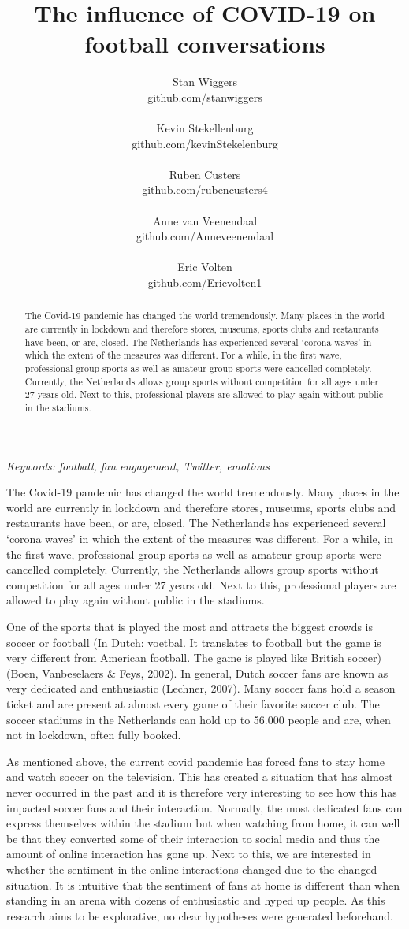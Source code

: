 \documentclass[12pt]{article}
\date{}
\title{The influence of COVID-19 on football conversations}
\author{Stan Wiggers \\ github.com/stanwiggers
\\ \\ Kevin Stekellenburg \\ github.com/kevinStekelenburg
\\ \\ Ruben Custers \\ github.com/rubencusters4
\\ \\ Anne van Veenendaal \\ github.com/Anneveenendaal
\\ \\ Eric Volten \\ github.com/Ericvolten1}
\providecommand{\keywords}[1]
{
   \small	
  \textit{\hspace{-1em} Keywords: } #1
}
\begin{document}
\maketitle
\thispagestyle{fancy}
\begin{abstract}
  \noindent  The Covid-19 pandemic has changed the world tremendously. Many places in the world are currently in lockdown and therefore stores, museums, sports clubs and restaurants have been, or are, closed. The Netherlands has experienced several ‘corona waves’ in which the extent of the measures was different. For a while, in the first wave, professional group sports as well as amateur group sports were cancelled completely. Currently, the Netherlands allows group sports without competition for all ages under 27 years old. Next to this, professional players are allowed to play again without public in the stadiums. 
\end{abstract}

\keywords{\textit{football, fan engagement, Twitter, emotions} \vspace{8ex}}

\noindent The Covid-19 pandemic has changed the world tremendously. Many places in the world are currently in lockdown and therefore stores, museums, sports clubs and restaurants have been, or are, closed. The Netherlands has experienced several ‘corona waves’ in which the extent of the measures was different. For a while, in the first wave, professional group sports as well as amateur group sports were cancelled completely. Currently, the Netherlands allows group sports without competition for all ages under 27 years old. Next to this, professional players are allowed to play again without public in the stadiums. 

One of the sports that is played the most and attracts the biggest crowds is soccer or football (In Dutch: voetbal. It translates to football but the game is very different from American football. The game is played like British soccer) (Boen, Vanbeselaers \& Feys, 2002). In general, Dutch soccer fans are known as very dedicated and enthusiastic (Lechner, 2007). Many soccer fans hold a season ticket and are present at almost every game of their favorite soccer club. The soccer stadiums in the Netherlands can hold up to 56.000 people and are, when not in lockdown, often fully booked. 

As mentioned above, the current covid pandemic has forced fans to stay home and watch soccer on the television. This has created a situation that has almost never occurred in the past and it is therefore very interesting to see how this has impacted soccer fans and their interaction. Normally, the most dedicated fans can express themselves within the stadium but when watching from home, it can well be that they converted some of their interaction to social media and thus the amount of online interaction has gone up. Next to this, we are interested in whether the sentiment in the online interactions changed due to the changed situation. It is intuitive that the sentiment of fans at home is different than when standing in an arena with dozens of enthusiastic and hyped up people. As this research aims to be explorative, no clear hypotheses were generated beforehand. 
\end{document}
